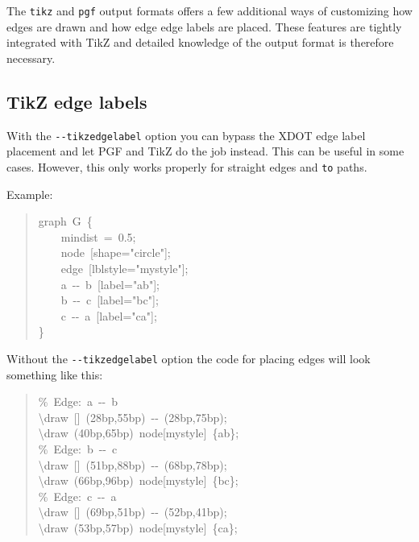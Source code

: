 \documentclass[10pt,a4paper,english]{article}
\begin{document}
The \texttt{tikz} and \texttt{pgf} output formats offers a few additional ways of customizing how edges are drawn and how edge edge labels are placed. These features are tightly integrated with TikZ and detailed knowledge of the output format is therefore necessary.



\hypertarget{tikz-edge-labels}{}
\subsection*{TikZ edge labels}
\label{tikz-edge-labels}

With the \texttt{-{}-tikzedgelabel} option you can bypass the XDOT edge label placement and let PGF and TikZ do the job instead. This can be useful in some cases. However, this only works properly for straight edges and \texttt{to} paths.

Example:
\begin{quote}{\ttfamily \raggedright \noindent
graph~G~{\{}~\\
~~~~mindist~=~0.5;~\\
~~~~node~{[}shape="circle"{]};~\\
~~~~edge~{[}lblstyle="mystyle"{]};~\\
~~~~a~-{}-~b~{[}label="ab"{]};~\\
~~~~b~-{}-~c~{[}label="bc"{]};~\\
~~~~c~-{}-~a~{[}label="ca"{]};~\\
{\}}
}\end{quote}

Without the \texttt{-{}-tikzedgelabel} option the code for placing edges will look something like this:
\begin{quote}{\ttfamily \raggedright \noindent
{\%}~Edge:~a~-{}-~b~\\
{\textbackslash}draw~{[}{]}~(28bp,55bp)~-{}-~(28bp,75bp);~\\
{\textbackslash}draw~(40bp,65bp)~node{[}mystyle{]}~{\{}ab{\}};~\\
{\%}~Edge:~b~-{}-~c~\\
{\textbackslash}draw~{[}{]}~(51bp,88bp)~-{}-~(68bp,78bp);~\\
{\textbackslash}draw~(66bp,96bp)~node{[}mystyle{]}~{\{}bc{\}};~\\
{\%}~Edge:~c~-{}-~a~\\
{\textbackslash}draw~{[}{]}~(69bp,51bp)~-{}-~(52bp,41bp);~\\
{\textbackslash}draw~(53bp,57bp)~node{[}mystyle{]}~{\{}ca{\}};
}\end{quote}
\end{document}
